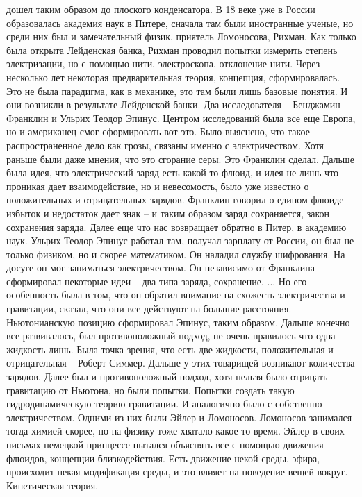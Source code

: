 \documentclass[a4paper, 12pt]{article}
\begin{document}
дошел таким образом до плоского конденсатора. В 18 веке уже в России 
образовалась академия наук в Питере, сначала там были иностранные 
ученые, но среди них был и замечательный физик, приятель Ломоносова, 
Рихман. Как только была открыта Лейденская банка, Рихман проводил 
попытки измерить степень электризации, но с помощью нити, электроскопа, 
отклонение нити. Через несколько лет некоторая предварительная теория, 
концепция, сформировалась. Это не была парадигма, как в механике, это 
там были лишь базовые понятия. И они возникли в результате Лейденской 
банки. Два исследователя -- Бенджамин Франклин и Ульрих Теодор Эпинус. 
Центром исследований была все еще Европа, но и американец смог 
сформировать вот это. Было выяснено, что такое распространенное дело как 
грозы, связаны именно с электричеством. Хотя раньше были даже мнения, 
что это сгорание серы. Это Франклин сделал. Дальше была идея, что 
электрический заряд есть какой-то флюид, и идея не лишь что проникая 
дает взаимодействие, но и невесомость, было уже известно о положительных 
и отрицательных зарядов. Франклин говорил о едином флюиде -- избыток 
и недостаток дает знак -- и таким образом заряд сохраняется, закон 
сохранения заряда. Далее еще что нас возвращает обратно в Питер, 
в академию наук. Ульрих Теодор Эпинус работал там, получал зарплату от 
России, он был не только физиком, но и скорее математиком. Он наладил 
службу шифрования. На досуге он мог заниматься электричеством. Он 
независимо от Франклина сформировал некоторые идеи -- два типа заряда, 
сохранение, ... Но его особенность была в том, что он обратил внимание 
на схожесть электричества и гравитации, сказал, что они все действуют на 
большие расстояния. Ньютонианскую позицию сформировал Эпинус, таким 
образом. Дальше конечно все развивалось, был противоположный подход, не 
очень нравилось что одна жидкость лишь. Была точка зрения, что есть две 
жидкости, положительная и отрицательная -- Роберт Симмер. Дальше у этих 
товарищей возникают количества зарядов. Далее был и противоположный 
подход, хотя нельзя было отрицать гравитацию от Ньютона, но были 
попытки. Попытки создать такую гидродинамическую теорию гравитации. 
И аналогично было с собственно электричеством. Одними из них были Эйлер 
и Ломоносов. Ломоносов занимался тогда химией скорее, но на физику тоже 
хватало какое-то время. Эйлер в своих письмах немецкой принцессе пытался 
объяснять все с помощью движения флюидов, концепции близкодействия. Есть 
движение некой среды, эфира, происходит некая модификация среды, и это 
влияет на поведение вещей вокруг. Кинетическая теория.
\end{document}
